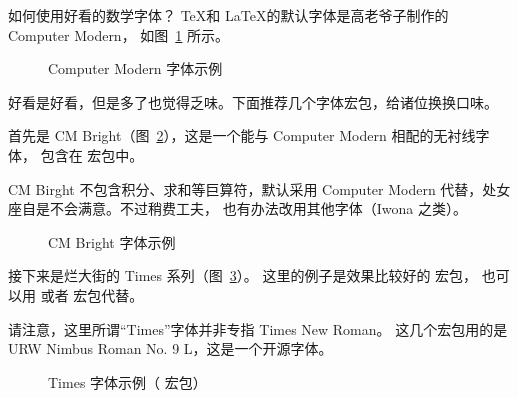 \begin{myQA}{如何使用好看的数学字体？}
	\TeX 和 \LaTeX 的默认字体是高老爷子制作的 Computer Modern，
	如图~\ref{Fig:cm_1} 所示。
	
	\begin{figure}[h]
		\centering
		\caption{Computer Modern 字体示例}
		\label{Fig:cm_1}
	\end{figure}
	
	好看是好看，但是多了也觉得乏味。下面推荐几个字体宏包，给诸位换换口味。
	
	首先是 CM Bright（图~\ref{Fig:cmbright}），这是一个能与
	Computer Modern 相配的无衬线字体，
	包含在  宏包中。
	
	CM Birght 不包含积分、求和等巨算符，默认采用
	Computer Modern 代替，处女座自是不会满意。不过稍费工夫，
	也有办法改用其他字体（Iwona 之类）。
	
	\begin{figure}[h]
		\centering
		\caption{CM Bright 字体示例}
		\label{Fig:cmbright}
	\end{figure}
	
	接下来是烂大街的 Times 系列（图~\ref{Fig:txfonts}）。
	这里的例子是效果比较好的   宏包，
	也可以用   或者
	  宏包代替。
	
	请注意，这里所谓“Times”字体并非专指 Times New Roman。
	这几个宏包用的是 URW Nimbus Roman No. 9 L，这是一个开源字体。
	
	\begin{figure}[h]
		\centering
		\caption{Times 字体示例（ 宏包）}
		\label{Fig:txfonts}
	\end{figure}
	

\end{myQA}
